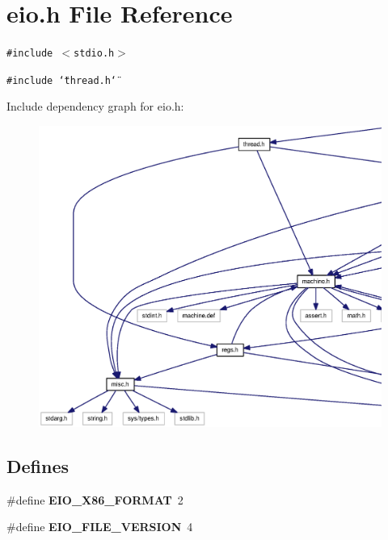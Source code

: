 \section{eio.h File Reference}
\label{eio_8h}
{\tt \#include $<$stdio.h$>$}\par
{\tt \#include \char`\"{}thread.h\char`\"{}}\par


Include dependency graph for eio.h:\nopagebreak
\begin{figure}[H]
\begin{center}
\leavevmode
\includegraphics[width=420pt]{eio_8h__incl}
\end{center}
\end{figure}
\subsection*{Defines}
\begin{CompactItemize}
\item 
\#define {\bf EIO\_\-X86\_\-FORMAT}~2
\item 
\#define {\bf EIO\_\-FILE\_\-VERSION}~4
\end{CompactItemize}
